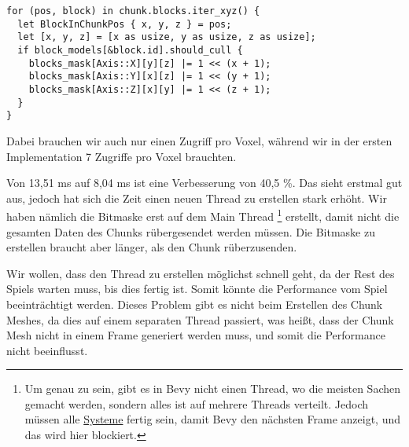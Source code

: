 \begin{verbatim}
for (pos, block) in chunk.blocks.iter_xyz() {
  let BlockInChunkPos { x, y, z } = pos;
  let [x, y, z] = [x as usize, y as usize, z as usize];
  if block_models[&block.id].should_cull {
    blocks_mask[Axis::X][y][z] |= 1 << (x + 1);
    blocks_mask[Axis::Y][x][z] |= 1 << (y + 1);
    blocks_mask[Axis::Z][x][y] |= 1 << (z + 1);
  }
}
\end{verbatim}

Dabei brauchen wir auch nur einen Zugriff pro Voxel,
während wir in der ersten Implementation 7 Zugriffe
pro Voxel brauchten.



\vspace{0.3cm}


\vspace{0.3cm}


Von 13,51 ms auf 8,04 ms ist eine Verbesserung
von 40,5 \%. Das sieht erstmal gut aus,
jedoch hat sich die Zeit einen neuen Thread zu
erstellen stark erhöht. Wir haben nämlich die Bitmaske
erst auf dem Main Thread
\footnote{Um genau zu sein, gibt es in Bevy
nicht einen  Thread, wo die meisten Sachen
gemacht werden, sondern alles ist auf mehrere Threads
verteilt. Jedoch müssen alle
\href{https://bevy-cheatbook.github.io/programming/systems.html}{Systeme}
fertig sein, damit Bevy den nächsten Frame anzeigt,
und das wird hier blockiert.}
erstellt, damit nicht die
gesamten Daten des Chunks rübergesendet werden müssen.
Die Bitmaske zu erstellen braucht aber länger,
als den Chunk rüberzusenden.

Wir wollen, dass den Thread zu erstellen möglichst
schnell geht, da der Rest des Spiels warten muss,
bis dies fertig ist. Somit könnte die Performance
vom Spiel beeinträchtigt werden. Dieses Problem gibt
es nicht beim Erstellen des Chunk Meshes, da dies auf
einem separaten Thread passiert, was heißt, dass der
Chunk Mesh nicht in einem Frame generiert werden muss,
und somit die Performance nicht beeinflusst.

